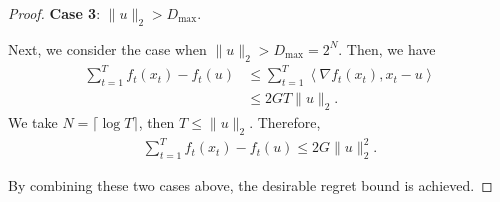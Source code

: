 \documentclass{article}
\theoremstyle{plain}
\theoremstyle{definition}
\theoremstyle{remark}
\newcommand{\cA}{\mathcal{A}}
\newcommand{\regret}{\mathfrak{R}}
\newcommand{\inner}[2]{\left\langle #1, #2 \right\rangle}
\newcommand{\adnote}[1]{{\color{blue!80!green!20!red} Adarsh: \emph{#1}}}
\renewcommand{\tilde}{\widetilde}
\begin{document}
\begin{proof}
\textbf{Case 3}: $\|u\|_2>D_{\max}$.

Next, we consider the case when $\|u\|_2>D_{\max}=2^N$. Then, we have
\begin{align*}
\sum_{t=1}^T f_t(x_t)-f_t(u)&\leq \sum_{t=1}^T \inner{\nabla f_t(x_t)}{x_t-u}\\
&\leq 2GT\|u\|_2.
\end{align*}
We take $N=\lceil\log T\rceil$, then $T\leq \|u\|_2$. Therefore,
\begin{align*}
\sum_{t=1}^T f_t(x_t)-f_t(u)\leq 2G\|u\|_2^2.
\end{align*}

By combining these two cases above, the desirable regret bound is achieved.
\end{proof}

\end{document}
